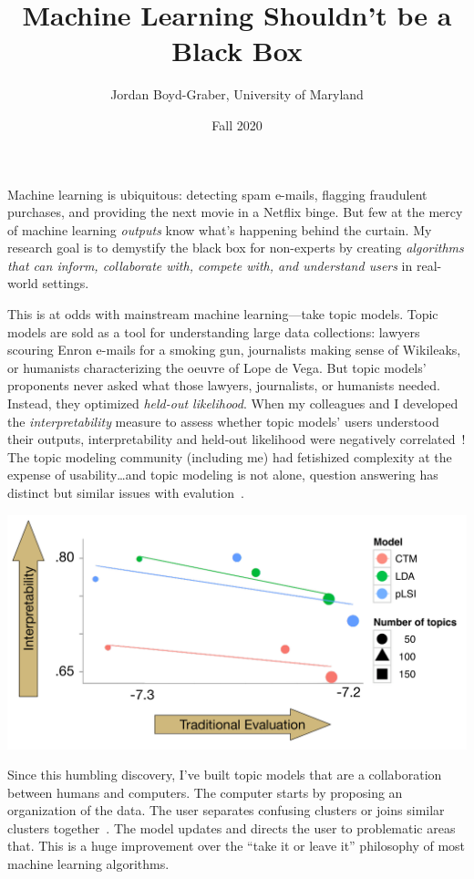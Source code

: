 \documentclass[11pt]{amsart}
\begin{document}
 \title{Machine Learning Shouldn't be a Black Box}

 \author{Jordan Boyd-Graber, University of Maryland}


\date{Fall 2020}

\maketitle

Machine learning is ubiquitous: detecting spam e-mails, flagging fraudulent
purchases, and providing the next movie in a Netflix binge.  But few at
the mercy of machine learning \emph{outputs} know what's happening behind the
curtain.  My research goal is to demystify the black box for non-experts by
creating \emph{algorithms that can inform, collaborate with, compete with, and
  understand users} in real-world settings.

This is at odds with mainstream machine learning---take topic models.  Topic
models are sold as a tool for understanding large data collections: lawyers
scouring Enron e-mails for a smoking gun, journalists making sense of Wikileaks,
or humanists characterizing the oeuvre of Lope de Vega.  But topic models'
proponents never asked what those lawyers, journalists, or humanists
needed. Instead, they optimized \emph{held-out likelihood}. When my colleagues
and I developed the \emph{interpretability} measure to assess whether topic
models' users understood their outputs, interpretability and
held-out likelihood were negatively correlated~\cite{chang-09b}! The topic
modeling community (including me) had fetishized complexity at the expense of
usability\dots and topic modeling is not alone, question answering has distinct but similar issues with evalution~\cite{boyd-graber-20}.

\begin{center}
\includegraphics[width=.5\linewidth]{images/prec_ll_4}
\end{center}

Since this humbling discovery, I've built topic models that are a collaboration
between humans and computers.  The computer starts by proposing an organization
of the data.  The user separates confusing clusters or joins
similar clusters together~\cite{hu-14:itm}.  The model updates and directs the user to
problematic areas that.  This is a huge improvement over the
``take it or leave it'' philosophy of most machine learning algorithms.
\end{document}
